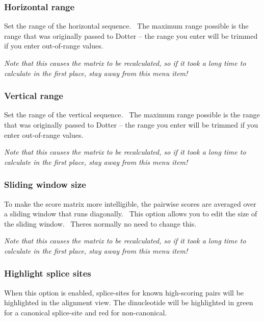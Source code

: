 \documentclass[letterpaper]{article}
\begin{document}
\bigskip

{\color[rgb]{0.30980393,0.5058824,0.7411765}\subsubsection[Horizontal range]{Horizontal range}}
{Set the range of the horizontal sequence. \ The maximum range possible
is the range that was originally passed to Dotter -- the range you
enter will be trimmed if you enter out-of-range values.}

\bigskip

{\itshape
Note that this causes the matrix to be recalculated, so if it took a
long time to calculate in the first place, stay away from this menu
item!}

\bigskip

{\color[rgb]{0.30980393,0.5058824,0.7411765}\subsubsection[Vertical range]{Vertical range}}
{Set the range of the vertical sequence. \ The maximum range possible is
the range that was originally passed to Dotter -- the range you enter
will be trimmed if you enter out-of-range values.}

\bigskip

{\itshape
Note that this causes the matrix to be recalculated, so if it took a
long time to calculate in the first place, stay away from this menu
item!}

\bigskip

{\color[rgb]{0.30980393,0.5058824,0.7411765}\subsubsection[Sliding window size]{Sliding window size}}
{To make the score matrix more intelligible, the pairwise scores are
averaged over a sliding window that runs diagonally. \ This option
allows you to edit the size of the sliding window.
\ There{\textquotesingle}s normally no need to change this.}

\bigskip

{\itshape
Note that this causes the matrix to be recalculated, so if it took a
long time to calculate in the first place, stay away from this menu
item!}

\bigskip

{\color[rgb]{0.30980393,0.5058824,0.7411765}\subsubsection[Show break{}-lines]{Highlight splice sites}}
When this option is enabled, splice-sites for known high-scoring pairs will be highlighted in the alignment view.
The dinucleotide will be highlighted in green for a canonical splice-site and red for non-canonical.
\end{document}
